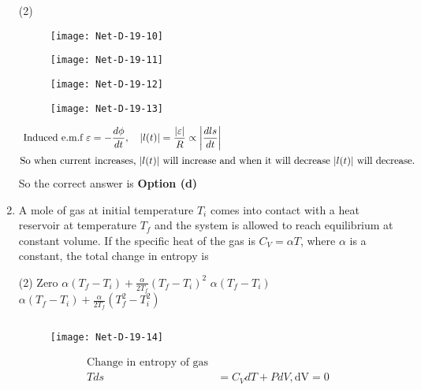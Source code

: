 \begin{enumerate}
 \begin{tasks}(2)
	\task[\textbf{a.}]
	\begin{figure}[H]
		\centering
		\texttt{[image: Net-D-19-10]}
	\end{figure}
	\task[\textbf{b.}]
		\begin{figure}[H]
		\centering
		\texttt{[image: Net-D-19-11]}
	\end{figure}
	\task[\textbf{c.}]
		\begin{figure}[H]
		\centering
		\texttt{[image: Net-D-19-12]}
	\end{figure}
	\task[\textbf{d.}] 
		\begin{figure}[H]
		\centering
		\texttt{[image: Net-D-19-13]}
	\end{figure}
\end{tasks}
\begin{answer}
	\begin{align*}
	\text { Induced e.m.f } \varepsilon&=-\frac{d \phi}{d t}, \quad|l(t)|=\frac{|\varepsilon|}{R} \propto\left|\frac{d l s}{d t}\right|\\
	\intertext{So when current increases, $|l(t)|$ will increase and when it will decrease $|l(t)|$ will decrease.}
	\end{align*}
		So the correct answer is \textbf{Option (d)}
\end{answer}
\item A mole of gas at initial temperature $T_{i}$ comes into contact with a heat reservoir at temperature $T_{f}$ and the system is allowed to reach equilibrium at constant volume. If the specific heat of the gas is $C_{V}=\alpha T$, where $\alpha$ is a constant, the total change in entropy is
 \begin{tasks}(2)
	\task[\textbf{a.}]Zero
	\task[\textbf{b.}] $\alpha\left(T_{f}-T_{i}\right)+\frac{\alpha}{2 T_{f}}\left(T_{f}-T_{i}\right)^{2}$
	\task[\textbf{c.}] $\alpha\left(T_{f}-T_{i}\right)$
	\task[\textbf{d.}]$\alpha\left(T_{f}-T_{i}\right)+\frac{\alpha}{2 T_{f}}\left(T_{f}^{2}-T_{i}^{2}\right)$
\end{tasks}
\begin{answer}$\left. \right. $
	\begin{figure}[H]
		\centering
		\texttt{[image: Net-D-19-14]}
	\end{figure}
	\begin{align*}
	\text{Change in entropy of gas}\\
	T d s&=C_{V} d T+P d V, \mathrm{dV}=0 \\

\end{align*}
\end{answer}
\end{enumerate}
